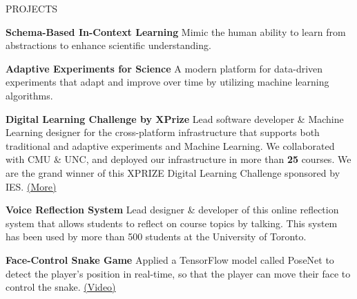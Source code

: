 \documentclass{resume} %
\begin{document}
\begin{rSection}{PROJECTS}
\vspace{-1.25em}
\item \textbf{Schema-Based In-Context Learning} {Mimic the human ability to learn from abstractions to enhance scientific understanding.}
\item \textbf{Adaptive Experiments for Science} {A modern platform for data-driven experiments that adapt and improve over time by utilizing machine learning algorithms.}

\item \textbf{Digital Learning Challenge by XPrize} {Lead software developer \& Machine Learning designer for the cross-platform infrastructure that supports both traditional and adaptive experiments and Machine Learning. We collaborated with CMU \& UNC, and deployed our infrastructure in more than \textbf{25} courses. We are the grand winner of this XPRIZE Digital Learning Challenge sponsored by IES. \href{https://www.xprize.org/challenge/digitallearning/finalist-teams}{(More)}}

\item \textbf{Voice Reflection System} {Lead designer \& developer of this online reflection system that allows students to reflect on course topics by talking. This system has been used by more than 500 students at the University of Toronto.}

\item \textbf{Face-Control Snake Game} {Applied a TensorFlow model called PoseNet to detect the player's position in real-time, so that the player can move their face to control the snake. \href{https://www.youtube.com/watch?v=Zn_5Oy7DZJw}{(Video)}}
\end{rSection} 

    
\end{document}
